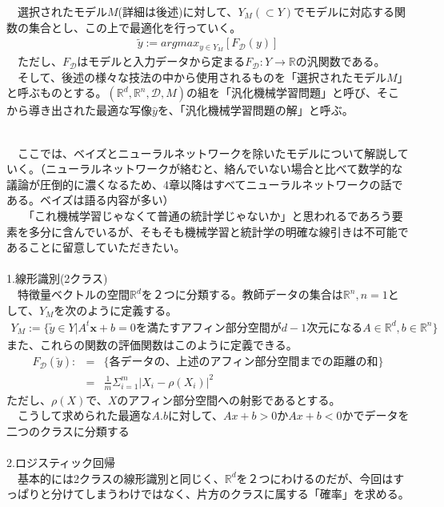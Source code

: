 \documentclass{jsarticle}
\begin{document}
　選択されたモデル$M$(詳細は後述)に対して、$Y_M(\subset Y)$でモデルに対応する関数の集合とし、この上で最適化を行っていく。\\
\begin{eqnarray}
\tilde{y}:=argmax_{y\in Y_M}[F_\mathcal{D}(y)]
\end{eqnarray}
　ただし、$F_\mathcal{D}$はモデルと入力データから定まる$F_\mathcal{D}:Y\rightarrow\mathbb{R}$の汎関数である。\\
　そして、後述の様々な技法の中から使用されるものを「選択されたモデル$M$」と呼ぶものとする。$(\mathbb{R}^d,\mathbb{R}^n,\mathcal{D},M)$の組を「汎化機械学習問題」と呼び、そこから導き出された最適な写像$\hat{y}$を、「汎化機械学習問題の解」と呼ぶ。

\newpage
\scalebox{1.1}{2.モデル設定}\\
　ここでは、ベイズとニューラルネットワークを除いたモデルについて解説していく。（ニューラルネットワークが絡むと、絡んでいない場合と比べて数学的な議論が圧倒的に濃くなるため、4章以降はすべてニューラルネットワークの話である。ベイズは語る内容が多い）\\
　　「これ機械学習じゃなくて普通の統計学じゃないか」と思われるであろう要素を多分に含んでいるが、そもそも機械学習と統計学の明確な線引きは不可能であることに留意していただきたい。\\
　\\
1.線形識別(2クラス)\\
　特徴量ベクトルの空間$\mathbb{R}^d$を２つに分類する。教師データの集合は$\mathbb{R}^n,n=1$として、$Y_M$を次のように定義する。
\begin{eqnarray}
Y_M:=\{\tilde{y}\in Y|A^t\bm{x}+b=0を満たすアフィン部分空間がd-1次元になるA\in \mathbb{R}^d,b\in\mathbb{R}^n \}
\end{eqnarray}
また、これらの関数の評価関数はこのように定義できる。
\begin{eqnarray}
F_\mathcal{D}(\tilde{y}):&=&\{各データの、上述のアフィン部分空間までの距離の和\}\nonumber\\
&=&\frac{1}{m}\Sigma_{i=1}^m |X_i-\rho(X_i)|^2
\end{eqnarray}
ただし、$\rho(X)$で、$X$のアフィン部分空間への射影であるとする。\\
　こうして求められた最適な$A.b$に対して、$Ax+b>0$か$Ax+b<0$かでデータを二つのクラスに分類する\\
　\\
2.ロジスティック回帰\\
　基本的には2クラスの線形識別と同じく、$\mathbb{R}^d$を２つにわけるのだが、今回はすっぱりと分けてしまうわけではなく、片方のクラスに属する「確率」を求める。\\
\end{document}

